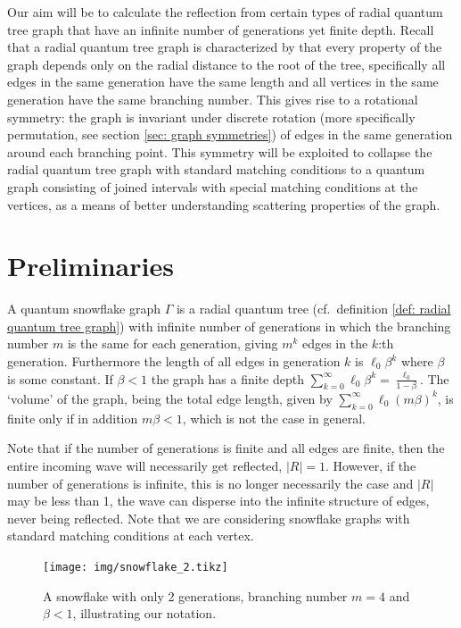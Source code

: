 
Our aim will be to calculate the reflection from certain types of radial quantum tree graph that have an infinite number of generations yet finite depth.  Recall that a radial quantum tree graph is characterized by that every property of the graph depends only on the radial distance to the root of the tree, specifically all edges in the same generation have the same length and all vertices in the same generation have the same branching number. This gives rise to a rotational symmetry: the graph is invariant under discrete rotation (more specifically permutation, see section \ref{sec: graph symmetries}) of edges in the same generation around each branching point. This symmetry will be exploited to collapse the radial quantum tree graph with standard matching conditions to a quantum graph consisting of joined intervals with special matching conditions at the vertices, as a means of better understanding scattering properties of the graph.


\section{Preliminaries}

A quantum snowflake graph $\Gamma$ is a radial quantum tree (cf.\ definition \ref{def: radial quantum tree graph}) with infinite number of generations in which the branching number $m$ is the same for each generation, giving $m^k$ edges in the $k$:th generation. Furthermore the length of all edges in generation $k$ is $\ell_0\beta^k$ where $\beta$ is some constant. If $\beta<1$ the graph has a finite depth $\sum_{k=0}^{\infty} \ell_0\beta^k = \frac{\ell_0}{1-\beta}$. The `volume' of the graph, being the total edge length, given by $\sum_{k=0}^{\infty} \ell_0(m\beta)^k$, is finite only if in addition $m\beta < 1$, which is not the case in general.

Note that if the number of generations is finite and all edges are finite, then the entire incoming wave will necessarily get reflected, $|R| = 1$. However, if the number of generations is infinite, this is no longer necessarily the case and $|R|$ may be less than 1, the wave can disperse into the infinite structure of edges, never being reflected. Note that we are considering snowflake graphs with standard matching conditions at each vertex.

\begin{figure}[!h]
  \centering
  \texttt{[image: img/snowflake\_2.tikz]}
  \caption{A snowflake with only 2 generations, branching number $m=4$ and $\beta < 1$, illustrating our notation.}
  \label{fig: snowflake notation}
\end{figure}

